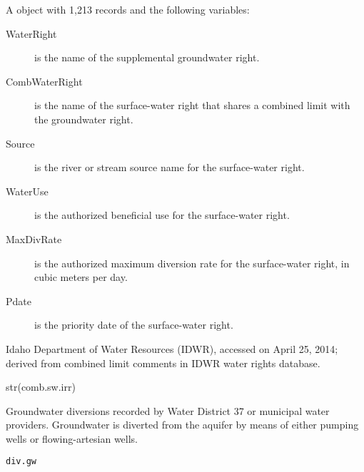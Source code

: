 \documentclass[a4paper]{book}
\begin{document}
%
\begin{Format}
A  object with 1,213 records and the following variables:
\begin{description}

\item[WaterRight] is the name of the supplemental groundwater right.
\item[CombWaterRight] is the name of the surface-water right that shares a combined limit with the groundwater right.
\item[Source] is the river or stream source name for the surface-water right.
\item[WaterUse] is the authorized beneficial use for the surface-water right.
\item[MaxDivRate] is the authorized maximum diversion rate for the surface-water right, in cubic meters per day.
\item[Pdate] is the priority date of the surface-water right.

\end{description}

\end{Format}
%
\begin{Source}\relax
Idaho Department of Water Resources (IDWR), accessed on April 25, 2014;
derived from combined limit comments in IDWR water rights database.
\end{Source}
%
\begin{Examples}
\begin{ExampleCode}
str(comb.sw.irr)
\end{ExampleCode}
\end{Examples}
%
\begin{Description}\relax
Groundwater diversions recorded by Water District 37 or municipal water providers.
Groundwater is diverted from the aquifer by means of either pumping wells or flowing-artesian wells.
\end{Description}
%
\begin{Usage}
\begin{verbatim}
div.gw
\end{verbatim}
\end{Usage}
%
\end{document}
